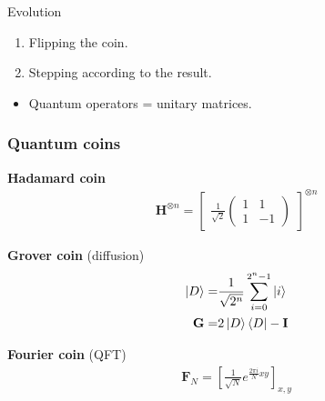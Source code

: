 \documentclass[aspectratio=169]{beamer}
\begin{document}
\begin{frame}{Evolution}
\begin{enumerate}
    \item Flipping the coin.
    \item Stepping according to the result.
\end{enumerate}
\begin{itemize}
    \item Quantum operators = unitary matrices.
\end{itemize}
\end{frame}

\begin{frame}
\frametitle{Quantum coins}

\pause

\textbf{Hadamard coin}
\vspace{-0.5cm}
\begin{align*}
  \mathbf{H}^{\otimes n} = \begin{bmatrix}\frac{1}{\sqrt{2}}\begin{pmatrix}
      1 & 1  \\
      1 & -1
  \end{pmatrix}
  \end{bmatrix}^{\otimes n}
\end{align*}

\pause
 
\textbf{Grover coin} (diffusion)
\vspace{-0.5cm}
\begin{align*}
\ket{D} =& \frac{1}{\sqrt{2^n}} \sum\limits_{i=0}^{2^n-1} \ket{i}\\
\mathbf{G} =& 2\ket{D}\bra{D} - \mathbf{I}
\end{align*}

\pause

\textbf{Fourier coin} (QFT)
\vspace{-0.5cm}
\begin{align*}
\mathbf{F}_N = \left[\frac{1}{\sqrt{N}} e^{\frac{2\pi{}i}{N}xy}\right]_{x,y}
\end{align*}
\end{frame}
\end{document}
